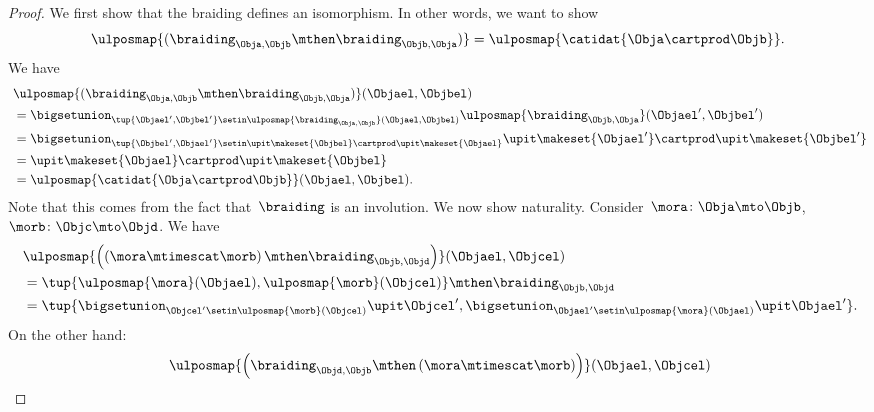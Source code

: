 \begin{proof}
    We first show that the braiding defines an isomorphism.
    In other words, we want to show
    \begin{equation}
        \ulposmap{(\braiding_{\Obja,\Objb}\mthen \braiding_{\Objb,\Obja})}=\ulposmap{\catidat{\Obja \cartprod \Objb}}.
    \end{equation}
    We have
    \begin{equation}
        \begin{aligned}
            ~ & \ulposmap{(\braiding_{\Obja,\Objb}\mthen \braiding_{\Objb,\Obja})}(\Objael,\Objbel) \\
              & =\bigsetunion_{\tup{\Objael',\Objbel'}\setin \ulposmap{\braiding_{\Obja,\Objb}}(\Objael,\Objbel)}\ulposmap{\braiding_{\Objb,\Obja}}(\Objael',\Objbel') \\
              & =\bigsetunion_{\tup{\Objbel',\Objael'}\setin \upit\makeset{\Objbel}\cartprod \upit\makeset{\Objael}}\upit\makeset{ \Objael'}\cartprod \upit\makeset{ \Objbel'} \\
              & =\upit\makeset{\Objael} \cartprod \upit\makeset{\Objbel} \\
              & =\ulposmap{\catidat{\Obja\cartprod \Objb}}(\Objael,\Objbel).
        \end{aligned}
    \end{equation}
    Note that this comes from the fact that~$\braiding$ is an involution.
    We now show naturality.
    Consider~$\mora \colon \Obja \mto \Objb$,~$\morb\colon \Objc \mto \Objd$.
    We have
    \begin{equation}
        \label{eq:braid-upos-natural-a}
        \begin{aligned}
            ~ & \ulposmap{\left(\left( \mora \mtimescat \morb\right)\mthen \braiding_{ \Objb, \Objd}\right)}(\Objael,\Objcel) \\
              & = \tup{\ulposmap{\mora}(\Objael),\ulposmap{\morb}(\Objcel)}\mthen \braiding_{ \Objb, \Objd} \\
              & =\tup{\bigsetunion_{\Objcel'\setin \ulposmap{\morb}(\Objcel)}\upit \Objcel',\bigsetunion_{\Objael'\setin \ulposmap{\mora}(\Objael)}\upit \Objael'}.
        \end{aligned}
    \end{equation}
    On the other hand:
    \begin{equation}
        \label{eq:braid-upos-natural-b}
        \begin{aligned}
            ~ & \ulposmap{\left(\braiding_{ \Objd, \Objb}\mthen \left( \mora \mtimescat \morb\right)\right)}(\Objael,\Objcel) \\

\end{aligned}
\end{equation}
\end{proof}
